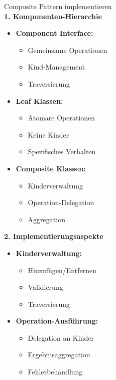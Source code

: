 \begin{KR}{Composite Pattern implementieren}\\
\textbf{1. Komponenten-Hierarchie}
\begin{itemize}
    \item \textbf{Component Interface:}
    \begin{itemize}
        \item Gemeinsame Operationen
        \item Kind-Management
        \item Traversierung
    \end{itemize}
    
    \item \textbf{Leaf Klassen:}
    \begin{itemize}
        \item Atomare Operationen
        \item Keine Kinder
        \item Spezifisches Verhalten
    \end{itemize}
    
    \item \textbf{Composite Klassen:}
    \begin{itemize}
        \item Kinderverwaltung
        \item Operation-Delegation
        \item Aggregation
    \end{itemize}
\end{itemize}

\textbf{2. Implementierungsaspekte}
\begin{itemize}
    \item \textbf{Kinderverwaltung:}
    \begin{itemize}
        \item Hinzufügen/Entfernen
        \item Validierung
        \item Traversierung
    \end{itemize}
    
    \item \textbf{Operation-Ausführung:}
    \begin{itemize}
        \item Delegation an Kinder
        \item Ergebnisaggregation
        \item Fehlerbehandlung
    \end{itemize}
\end{itemize}
\end{KR}

